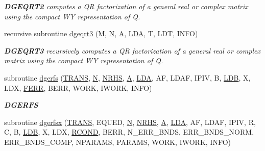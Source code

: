 \begin{DoxyCompactItemize}
\begin{DoxyCompactList}\small\item\em {\bfseries D\+G\+E\+Q\+R\+T2} computes a Q\+R factorization of a general real or complex matrix using the compact W\+Y representation of Q. \end{DoxyCompactList}\item 
recursive subroutine \hyperlink{group__doubleGEcomputational_ga3ad112f2b0890b3815e696628906f30c}{dgeqrt3} (M, \hyperlink{polmisc_8c_a0240ac851181b84ac374872dc5434ee4}{N}, \hyperlink{classA}{A}, \hyperlink{example__user_8c_ae946da542ce0db94dced19b2ecefd1aa}{L\+D\+A}, T, L\+D\+T, I\+N\+F\+O)
\begin{DoxyCompactList}\small\item\em {\bfseries D\+G\+E\+Q\+R\+T3} recursively computes a Q\+R factorization of a general real or complex matrix using the compact W\+Y representation of Q. \end{DoxyCompactList}\item 
subroutine \hyperlink{group__doubleGEcomputational_gac47363c60e542f007e7b6e1d48f0273b}{dgerfs} (\hyperlink{superlu__enum__consts_8h_a0c4e17b2d5cea33f9991ccc6a6678d62a1f61e3015bfe0f0c2c3fda4c5a0cdf58}{T\+R\+A\+N\+S}, \hyperlink{polmisc_8c_a0240ac851181b84ac374872dc5434ee4}{N}, \hyperlink{example__user_8c_aa0138da002ce2a90360df2f521eb3198}{N\+R\+H\+S}, \hyperlink{classA}{A}, \hyperlink{example__user_8c_ae946da542ce0db94dced19b2ecefd1aa}{L\+D\+A}, A\+F, L\+D\+A\+F, I\+P\+I\+V, B, \hyperlink{example__user_8c_a50e90a7104df172b5a89a06c47fcca04}{L\+D\+B}, X, L\+D\+X, \hyperlink{superlu__enum__consts_8h_af00a42ecad444bbda75cde1b64bd7e72a78fd14d7abebae04095cfbe02928f153}{F\+E\+R\+R}, B\+E\+R\+R, W\+O\+R\+K, I\+W\+O\+R\+K, I\+N\+F\+O)
\begin{DoxyCompactList}\small\item\em {\bfseries D\+G\+E\+R\+F\+S} \end{DoxyCompactList}\item 
subroutine \hyperlink{group__doubleGEcomputational_gae60113eba7a360d9c92cc2b627e0c5d2}{dgerfsx} (\hyperlink{superlu__enum__consts_8h_a0c4e17b2d5cea33f9991ccc6a6678d62a1f61e3015bfe0f0c2c3fda4c5a0cdf58}{T\+R\+A\+N\+S}, E\+Q\+U\+E\+D, \hyperlink{polmisc_8c_a0240ac851181b84ac374872dc5434ee4}{N}, \hyperlink{example__user_8c_aa0138da002ce2a90360df2f521eb3198}{N\+R\+H\+S}, \hyperlink{classA}{A}, \hyperlink{example__user_8c_ae946da542ce0db94dced19b2ecefd1aa}{L\+D\+A}, A\+F, L\+D\+A\+F, I\+P\+I\+V, R, C, B, \hyperlink{example__user_8c_a50e90a7104df172b5a89a06c47fcca04}{L\+D\+B}, X, L\+D\+X, \hyperlink{superlu__enum__consts_8h_af00a42ecad444bbda75cde1b64bd7e72a9b5c151728d8512307565994c89919d5}{R\+C\+O\+N\+D}, B\+E\+R\+R, N\+\_\+\+E\+R\+R\+\_\+\+B\+N\+D\+S, E\+R\+R\+\_\+\+B\+N\+D\+S\+\_\+\+N\+O\+R\+M, E\+R\+R\+\_\+\+B\+N\+D\+S\+\_\+\+C\+O\+M\+P, N\+P\+A\+R\+A\+M\+S, P\+A\+R\+A\+M\+S, W\+O\+R\+K, I\+W\+O\+R\+K, I\+N\+F\+O)

\end{DoxyCompactItemize}
